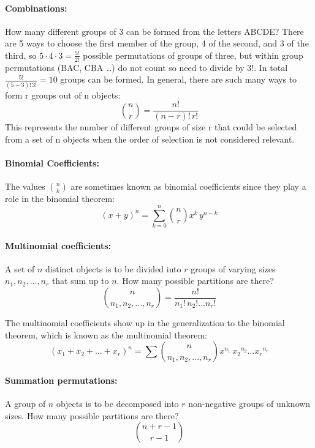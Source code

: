 \documentclass[12pt]{article}
\begin{document}
\paragraph{Combinations:} How many different groups of 3 can be formed from the letters ABCDE? There are 5 ways to choose the first member of the group, 4 of the second, and 3 of the third, so $5\cdot4\cdot3 = \frac{5!}{2!}$ possible permutations of groups of three, but within group permutations (BAC, CBA \dots) do not count so need to divide by $3!$. In total $\frac{5!}{(5-3)!\,3!} = 10$ groups can be formed. In general, there are such many ways to form r groups out of n objects:
\[
{{n}\choose{r}} = \frac{n!}{(n-r)! \, r!}
\]
%
This represents the number of different groups of size r that could be selected from a set of n objects when the order of selection is not considered relevant.


\paragraph{Binomial Coefficients:} 
The values ${n}\choose{k}$ are sometimes known as binomial coefficients since they play a role in the binomial theorem:
\[
(x+y)^n = \sum^n_{k = 0} {{n}\choose{r}} x^k \, y^{n-k}
\]

\paragraph{Multinomial coefficients:} A set of $n$ distinct objects is to be divided into $r$ groups of varying sizes $n_1, n_2, \dots, n_r$ that sum up to $n$. How many possible partitions are there? 
\[
{{n}\choose{n_1, n_2, \dots, n_r}} = \frac{n!}{n_1!\,n_2!\dots n_r!}
\]

The multinomial coefficients show up in the generalization to the binomial theorem, which is known as the multinomial theorem:
\[
(x_1 + x_2 + \dots + x_r)^n = \sum {{n}\choose{n_1,n_2,\dots,n_r}} x^{n_1} \, {x_2}^{n_2} \dots {x_r}^{n_r}
\]

\paragraph{Summation permutations:} A group of $n$ objects is to be decomposed into $r$ non-negative groups of unknown sizes. How many possible partitions are there?
\[
{n+r-1}\choose{r-1}
\]
\end{document}
